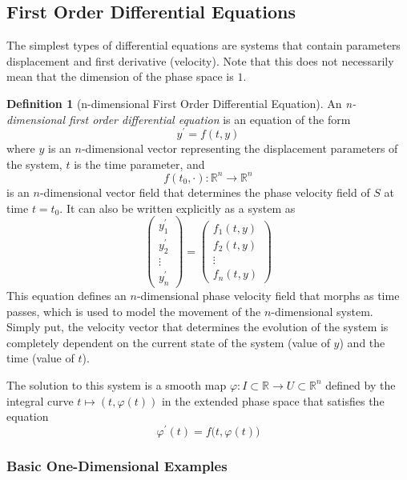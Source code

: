 \documentclass{article}
\theoremstyle{remark}
\theoremstyle{definition}
\newtheorem{definition}{Definition}[section]
\begin{document}
\subsection{First Order Differential Equations}
The simplest types of differential equations are systems that contain parameters displacement and first derivative (velocity). Note that this does not necessarily mean that the dimension of the phase space is $1$. 

\begin{definition}[n-dimensional First Order Differential Equation]
An \textit{n-dimensional first order differential equation} is an equation of the form
\[y^\prime = f(t, y)\]
where $y$ is an $n$-dimensional vector representing the displacement parameters of the system, $t$ is the time parameter, and
\[f(t_0, \cdot) : \mathbb{R}^n \longrightarrow \mathbb{R}^n\]
is an $n$-dimensional vector field that determines the phase velocity field of $S$ at time $t = t_0$. It can also be written explicitly as a system as 
\[\begin{pmatrix}
y_1^\prime \\ y_2^\prime \\ \vdots \\ y_n^\prime
\end{pmatrix} = \begin{pmatrix}
f_1 (t, y) \\ f_2 (t, y) \\ \vdots \\ f_n (t, y)
\end{pmatrix}\]
This equation defines an $n$-dimensional phase velocity field that morphs as time passes, which is used to model the movement of the $n$-dimensional system. Simply put, the velocity vector that determines the evolution of the system is completely dependent on the current state of the system (value of $y$) and the time (value of $t$). 

The solution to this system is a smooth map $\varphi: I \subset \mathbb{R} \longrightarrow U \subset \mathbb{R}^n$ defined by the integral curve $t \mapsto (t, \varphi(t))$ in the extended phase space that satisfies the equation
\[\varphi^\prime (t) = f\big( t, \varphi(t) \big)\]
\end{definition}

\subsubsection{Basic One-Dimensional Examples}
\end{document}

